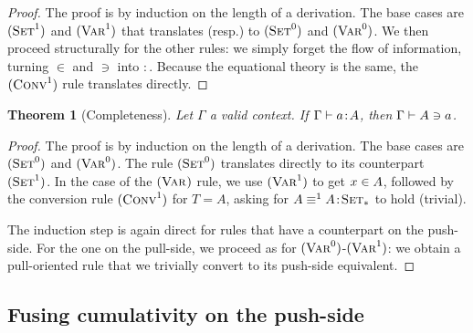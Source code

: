 \documentclass[preprint
              , authoryear
              , onecolumn
              ]{sigplanconf}
\newtheorem{theorem}{Theorem}
\newcommand{\ruleName}[2]{(\mathrm{\textsc{#1}}^{#2})}
\newcommand{\ruleSet}[1]{\ruleName{Set}{#1}}
\newcommand{\ruleConv}[1]{\ruleName{Conv}{#1}}
\newcommand{\ruleVar}[1]{\ruleName{Var}{#1}}
\begin{document}

\begin{proof}

The proof is by induction on the length of a derivation. The base
cases are $\ruleSet{1}$ and $\ruleVar{1}$ that translates (resp.) to
$\ruleSet{0}$ and $\ruleVar{0}$. We then proceed structurally for the
other rules: we simply forget the flow of information, turning $\in$
and $\ni$ into $:$. Because the equational theory is the same, the
$\ruleConv{1}$ rule translates directly.

\end{proof}


\begin{theorem}[Completeness]

Let $\Gamma$ a valid context. If \xspace$\Gamma \vdash \Bhab{a}{A}$, then
$\Gamma \vdash \push{a}{A}$.

\end{theorem}


\begin{proof}

The proof is by induction on the length of a derivation. The base
cases are $\ruleSet{0}$ and $\ruleVar{0}$. The rule $\ruleSet{0}$
translates directly to its counterpart $\ruleSet{1}$. In the case of
the $\ruleVar{}$ rule, we use $\ruleVar{1}$ to get $\pull{x}{A}$,
followed by the conversion rule $\ruleConv{1}$ for $T = A$, asking for
$\equalN{A}{A}{1}{\SetTop}$ to hold (trivial).

The induction step is again direct for rules that have a counterpart
on the push-side. For the one on the pull-side, we proceed as for
$\ruleVar{0}$-$\ruleVar{1}$: we obtain a pull-oriented rule that we
trivially convert to its push-side equivalent.

\end{proof}

\subsection{Fusing cumulativity on the push-side}

\end{document}
